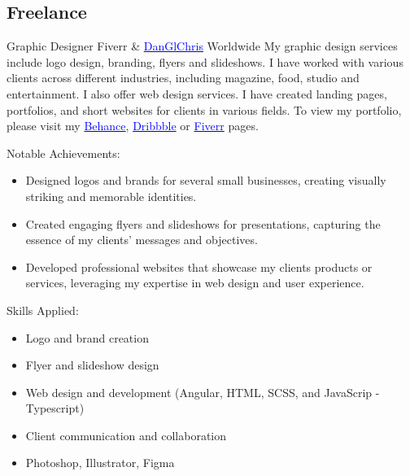 \vspace{1mm}
\newpage
\subsection{\textbf{Freelance}}

    {Graphic Designer}
    {Fiverr \& \href{https://danglchris.netlify.app/}{\textcolor{blue}{DanGlChris}}}
    {Worldwide}
    {
    \newline
    My graphic design services include logo design, branding, flyers and slideshows. I have worked with various clients across different industries, including magazine, food, studio and entertainment. 
    \newline
    I also offer web design services. I have created landing pages, portfolios, and short websites for clients in various fields.
    To view my portfolio, please visit my \href{https://www.behance.net/kankwandadaglox}{\textcolor{blue}{Behance}}, \href{https://dribbble.com/DanGlChris}{\textcolor{blue}{Dribbble}} or 
    \href{https://www.fiverr.com/danglchris/design-in-one-day-a-professional-creative-minimalist-logo-634d?utm_campaign=gigs_show&utm_medium=shared&utm_source=copy_link&utm_term=plvgj8}{\textcolor{blue}{Fiverr}} pages.
    } 
    {\newline
    Notable Achievements:
    \begin{itemize}
        \item Designed logos and brands for several small businesses, creating visually striking and memorable identities.
        \item Created engaging flyers and slideshows for presentations, capturing the essence of my clients' messages and objectives.
        \item Developed professional websites that showcase my clients products or services, leveraging my expertise in web design and user experience.
    \end{itemize}
    \vspace{1mm}
    Skills Applied:
    \begin{itemize}
        \item Logo and brand creation
        \item Flyer and slideshow design
        \item Web design and development (Angular, HTML, SCSS, and JavaScrip - Typescript)
        \item Client communication and collaboration
        \item Photoshop, Illustrator, Figma
    \end{itemize}
    }

